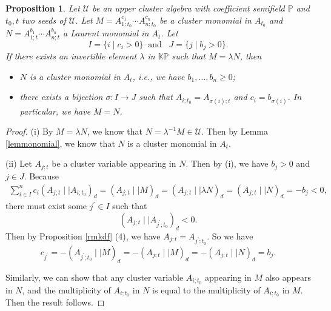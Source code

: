 \documentclass{amsart}
\newtheorem{proposition}[theorem]{Proposition}
\theoremstyle{definition}
\theoremstyle{remark}
\numberwithin{equation}{section}
\begin{document}
\begin{proposition}\label{promono}
Let $\mathcal U$ be an upper cluster algebra with coefficient semifield $\mathbb P$  and $t_0, t$ two seeds of $\mathcal U$.
 Let $M=A_{1;t_0}^{c_1}\cdots A_{n;t_0}^{c_n}$ be a cluster monomial in $A_{t_0}$ and $N=A_{1;t}^{b_1}\cdots A_{n;t}^{b_n}$ a Laurent monomial in $A_{t}$.
 Let $$I=\{i\mid c_i>0\}\;\;\text{and}\;\;\;J=\{j\mid b_j>0\}.$$ If there exists an invertible element $\lambda$ in $\mathbb {KP}$ such that $M=\lambda N$, then
 \begin{itemize}
 \item[(i)] $N$ is a cluster monomial in $A_{t}$, i.e., we have $b_1,\ldots,b_n\geq0$;

 \item[(ii)] there exists a bijection $\sigma:I\rightarrow J$ such that $A_{i;t_0}=A_{\sigma(i);t}$ and $c_{i}=b_{\sigma(i)}$. In particular, we have $M=N$.
 \end{itemize}
\end{proposition}
\begin{proof}(i)
By $M=\lambda N$, we know that $N=\lambda^{-1}M\in\mathcal U$. Then by Lemma \ref{lemmonomial}, we know that $N$ is a cluster monomial in $A_{t}$.

(ii) Let $A_{j;t}$ be a cluster variable appearing in $N$. Then by (i), we have $b_j>0$ and $j\in J$. Because 
\begin{eqnarray}
\sum\limits_{i\in I}^nc_i(A_{j;t}\mid\mid A_{i;t_0})_d=(A_{j;t}\mid\mid M)_d=(A_{j;t}\mid\mid \lambda N)_d=(A_{j;t}\mid\mid  N)_d=-b_j<0,\nonumber
\end{eqnarray}
 there must exist some $j^\prime\in I$  such that $$(A_{j;t}\mid\mid A_{j^\prime;t_0})_d<0.$$ Then by Proposition \ref{rmkdf} (4), we have $A_{j;t}=A_{j^\prime;t_0}$. So we have
 $$c_{j^\prime}=-(A_{j^\prime;t_0}\mid\mid M)_d=-(A_{j;t}\mid\mid M)_d=-(A_{j;t}\mid\mid N)_d=b_j.$$


Similarly, we can show that any cluster variable $A_{i;t_0}$ appearing in $M$ also appears in $N$, and the multiplicity of $A_{i;t_0}$ in $N$ is equal to the multiplicity of $A_{i;t_0}$ in $M$. Then the result follows.
\end{proof}
\end{document}
